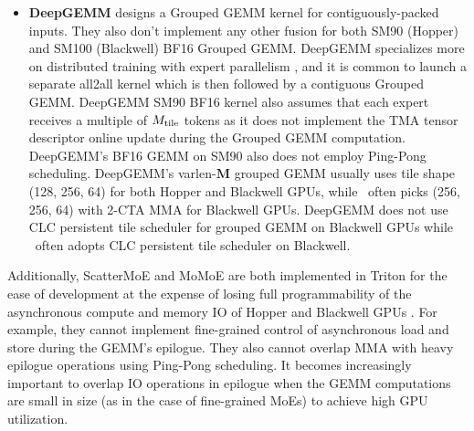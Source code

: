 \begin{itemize}
    \item \textbf{DeepGEMM} \citep{deepgemm} designs a Grouped GEMM kernel for contiguously-packed inputs. They also don't implement any other fusion for both SM90 (Hopper) and SM100 (Blackwell) BF16 Grouped GEMM. DeepGEMM specializes more on distributed training with expert parallelism \citep{deepep2025}, and it is common to launch a separate all2all kernel \citep{lepikhingshard} which is then followed by a contiguous Grouped GEMM. DeepGEMM SM90 BF16 kernel also assumes that each expert receives a multiple of $M_\mathrm{tile}$ tokens as it does not implement the TMA tensor descriptor online update during the Grouped GEMM computation. DeepGEMM's BF16 GEMM on SM90 also does not employ Ping-Pong scheduling. DeepGEMM's varlen-$\mathbf{M}$ grouped GEMM usually uses tile shape (128, 256, 64) for both Hopper and Blackwell GPUs, while \Algname~often picks (256, 256, 64) with 2-CTA MMA for Blackwell GPUs. DeepGEMM does not use CLC persistent tile scheduler for grouped GEMM on Blackwell GPUs while \Algname~often adopts CLC persistent tile scheduler on Blackwell. 
\end{itemize}

Additionally, ScatterMoE and MoMoE are both implemented in Triton \citep{triton} for the ease of development at the expense of losing full programmability of the asynchronous compute and memory IO of Hopper and Blackwell GPUs \citep{nvidia2022_h100,nvidia2022_gb200}. For example, they cannot implement fine-grained control of asynchronous load and store during the GEMM's epilogue. They also cannot overlap MMA with heavy epilogue operations using Ping-Pong scheduling. It becomes increasingly important to overlap IO operations in epilogue when the GEMM computations are small in size (as in the case of fine-grained MoEs) to achieve high GPU utilization.
